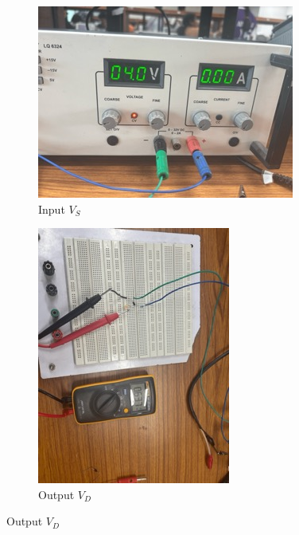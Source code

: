 \documentclass[12pt,a4paper]{article}
\begin{document}
\begin{figure}[h!]
\centering
\begin{subfigure}[b]{0.47\linewidth}
    \centering
    \includegraphics[width=\textwidth]{Experiment_5/figs/iv_dc_2 Small.jpeg}
    \caption{Input $V_S$}
\end{subfigure}
\begin{subfigure}[b]{0.48\linewidth}
    \centering
    \includegraphics[angle=90, width=\textwidth]{Experiment_5/figs/iv_ckt_2 Small.jpeg}
    \caption{Output $V_D$}
\end{subfigure}
\end{figure}
\end{document}
